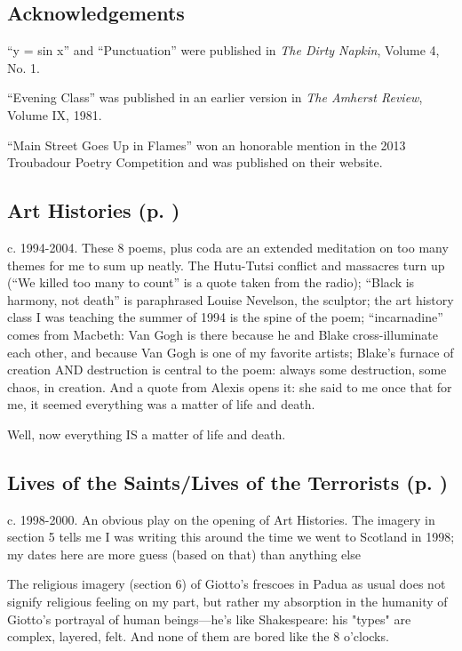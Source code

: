 \subsection*{Acknowledgements}

``y = sin x'' and ``Punctuation'' were published in \textit{The Dirty Napkin}, Volume 4, No. 1.

``Evening Class'' was published in an earlier version in \textit{The Amherst Review}, Volume IX, 1981.

``Main Street Goes Up in Flames'' won an honorable mention in the 2013 Troubadour Poetry Competition and was published on their website.

\subsection*{Art Histories (p. \pageref{ch:art_histories})}
c. 1994-2004. These 8 poems, plus coda are an extended meditation on too many themes
for me to sum up neatly. The Hutu-Tutsi conflict and massacres turn up
(``We killed too many to count'' is a quote taken from the radio); ``Black
is harmony, not death'' is paraphrased Louise Nevelson, the sculptor; the
art history class I was teaching the summer of 1994 is the spine of the
poem; ``incarnadine'' comes from Macbeth: Van Gogh is there because he and
Blake cross-illuminate each other, and because Van Gogh is one of my
favorite artists; Blake's furnace of creation AND destruction is central
to the poem: always some destruction, some chaos, in creation. And a
quote from Alexis opens it: she said to me once that for me, it seemed
everything was a matter of life and death.

Well, now everything IS a matter of life and death.

\subsection*{Lives of the Saints/Lives of the Terrorists (p. \pageref{ch:lives_of_the_saints})}
c. 1998-2000. An obvious play on the opening of Art
Histories. The imagery in section 5 tells me I was writing this around
the time we went to Scotland in 1998; my dates here are more guess
(based on that) than anything else

The religious imagery (section 6) of Giotto's frescoes in Padua as usual
does not signify religious feeling on my part, but rather my absorption
in the humanity of Giotto's portrayal of human beings---he's like
Shakespeare: his "types" are complex, layered, felt. And none of them
are bored like the 8 o'clocks.

